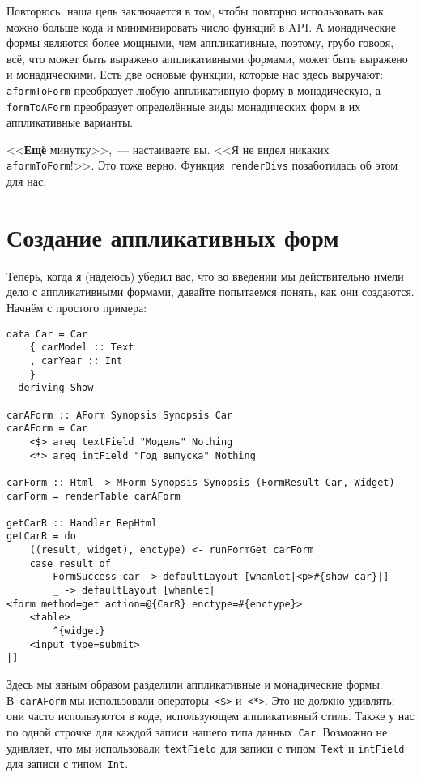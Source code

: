 Повторюсь, наша цель заключается в том, чтобы повторно использовать как можно
больше кода и минимизировать число функций в API. А монадические формы
являются более мощными, чем аппликативные, поэтому, грубо говоря, всё, что
может быть выражено аппликативными формами, может быть выражено и
монадическими. Есть две основые функции, которые нас здесь выручают:
\lstinline'aformToForm' преобразует любую аппликативную форму в монадическую,
а \lstinline'formToAForm' преобразует определённые виды монадических форм в их
аппликативные варианты.

<<\textbf{Ещё} минутку>>,~--- настаиваете вы. <<Я не видел никаких
\lstinline'aformToForm'!>>. Это тоже верно.  Функция~\lstinline'renderDivs'
позаботилась об этом для нас.

\section{Создание аппликативных форм}
Теперь, когда я (надеюсь) убедил вас, что во введении мы действительно имели
дело с аппликативными формами, давайте попытаемся понять, как они создаются.
Начнём с простого примера:

\begin{lstlisting}
data Car = Car
    { carModel :: Text
    , carYear :: Int
    }
  deriving Show

carAForm :: AForm Synopsis Synopsis Car
carAForm = Car
    <$> areq textField "Модель" Nothing
    <*> areq intField "Год выпуска" Nothing

carForm :: Html -> MForm Synopsis Synopsis (FormResult Car, Widget)
carForm = renderTable carAForm

getCarR :: Handler RepHtml
getCarR = do
    ((result, widget), enctype) <- runFormGet carForm
    case result of
        FormSuccess car -> defaultLayout [whamlet|<p>#{show car}|]
        _ -> defaultLayout [whamlet|
<form method=get action=@{CarR} enctype=#{enctype}>
    <table>
        ^{widget}
    <input type=submit>
|]
\end{lstlisting}

Здесь мы явным образом разделили аппликативные и монадические формы.
В~\lstinline'carAForm' мы использовали операторы~\lstinline'<$>'
и~\lstinline'<*>'. Это не должно удивлять; они часто используются в коде,
использующем аппликативный стиль. Также у нас по одной строчке для каждой
записи нашего типа данных~\lstinline'Car'. Возможно не удивляет, что мы
использовали \lstinline'textField' для записи с типом~\lstinline'Text' и
\lstinline'intField' для записи с типом~\lstinline'Int'.


